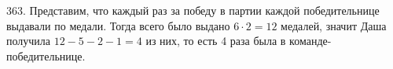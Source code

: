 363. Представим, что каждый раз за победу в партии каждой победительнице выдавали по медали. Тогда всего было выдано $6\cdot2=12$ медалей, значит Даша получила $12-5-2-1=4$ из них, то есть 4 раза была в команде-победительнице.\\
